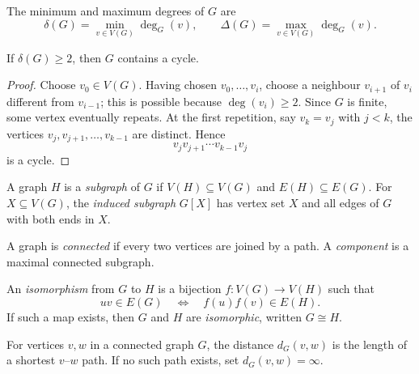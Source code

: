 \begin{notedefinition}
The minimum and maximum degrees of $G$ are
\[
  \delta(G)=\min_{v\in V(G)}\deg_G(v),
  \qquad
  \Delta(G)=\max_{v\in V(G)}\deg_G(v).
\]
\end{notedefinition}

\begin{notetheorem}
If $\delta(G)\ge 2$, then $G$ contains a cycle.
\end{notetheorem}
\begin{proof}
Choose $v_0\in V(G)$.  Having chosen $v_0,\ldots,v_i$, choose a neighbour $v_{i+1}$ of $v_i$ different from $v_{i-1}$; this is possible because $\deg(v_i)\ge2$.  Since $G$ is finite, some vertex eventually repeats.  At the first repetition, say $v_k=v_j$ with $j<k$, the vertices $v_j,v_{j+1},\ldots,v_{k-1}$ are distinct.  Hence
\[
  v_jv_{j+1}\cdots v_{k-1}v_j
\]
is a cycle.
\end{proof}
\begin{notedefinition}
A graph $H$ is a \emph{subgraph} of $G$ if $V(H)\subseteq V(G)$ and $E(H)\subseteq E(G)$.  For $X\subseteq V(G)$, the \emph{induced subgraph} $G[X]$ has vertex set $X$ and all edges of $G$ with both ends in $X$.

A graph is \emph{connected} if every two vertices are joined by a path.  A \emph{component} is a maximal connected subgraph.
\end{notedefinition}

\begin{notedefinition}
An \emph{isomorphism} from $G$ to $H$ is a bijection $f:V(G)\to V(H)$ such that
\[
  uv\in E(G)\quad\Longleftrightarrow\quad f(u)f(v)\in E(H).
\]
If such a map exists, then $G$ and $H$ are \emph{isomorphic}, written $G\cong H$.
\end{notedefinition}

\begin{notedefinition}
For vertices $v,w$ in a connected graph $G$, the distance $d_G(v,w)$ is the length of a shortest $v$--$w$ path.  If no such path exists, set $d_G(v,w)=\infty$.
\end{notedefinition}

